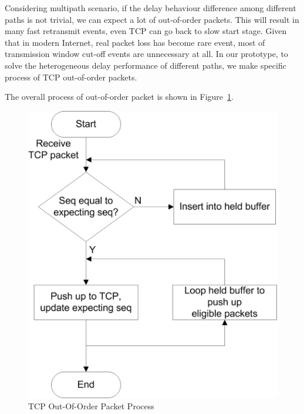 
Considering multipath scenario, if the delay behaviour difference among different paths is not trivial, we can expect a lot of out-of-order packets. This will result in many fast retransmit events, even TCP can go back to slow start stage. Given that in modern Internet, real packet loss has become rare event, most of transmission window cut-off events are unnecessary at all. In our prototype, to solve the heterogeneous delay performance of different paths, we make specific process of TCP out-of-order packets. 

The overall process of out-of-order packet is shown in Figure~\ref{fig.outoforder}.

\begin{figure}
\centering
\includegraphics[width=0.8\linewidth]{fig/outoforder.eps}
\caption{TCP Out-Of-Order Packet Process}
\label{fig.outoforder}
\end{figure}


